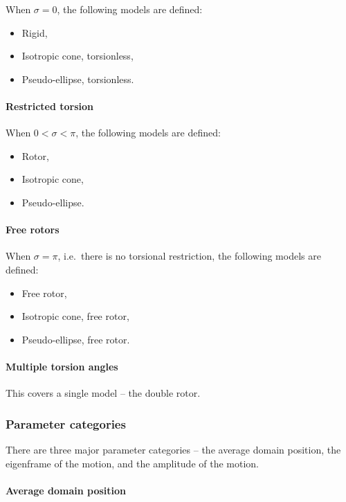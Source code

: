 When $\sigma = 0$, the following models are defined:
\begin{itemize}
    \item Rigid,
    \item Isotropic cone, torsionless,
    \item Pseudo-ellipse, torsionless.
\end{itemize}


\paragraph{Restricted torsion}

When $0 < \sigma < \pi$, the following models are defined:
\begin{itemize}
    \item Rotor,
    \item Isotropic cone,
    \item Pseudo-ellipse.
\end{itemize}


\paragraph{Free rotors}

When $\sigma = \pi$, i.e.\ there is no torsional restriction, the following models are defined:
\begin{itemize}
    \item Free rotor,
    \item Isotropic cone, free rotor,
    \item Pseudo-ellipse, free rotor.
\end{itemize}


\paragraph{Multiple torsion angles}

This covers a single model -- the double rotor.


\subsubsection{Parameter categories}

There are three major parameter categories -- the average domain position, the eigenframe of the motion, and the amplitude of the motion.


\paragraph{Average domain position}

